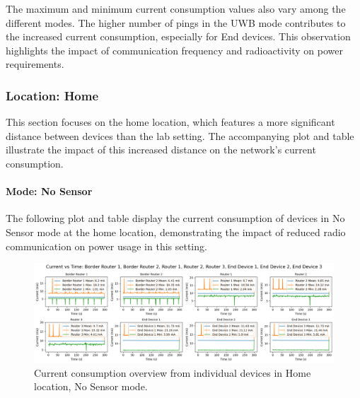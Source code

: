 The maximum and minimum current consumption values also vary among the different modes. The higher number of pings in the UWB mode contributes to the increased current consumption, especially for End devices. This observation highlights the impact of communication frequency and radioactivity on power requirements.

\subsubsection{Location: Home}
This section focuses on the home location, which features a more significant distance between devices than the lab setting. The accompanying plot and table illustrate the impact of this increased distance on the network's current consumption.

\paragraph{Mode: No Sensor}
The following plot and table display the current consumption of devices in No Sensor mode at the home location, demonstrating the impact of reduced radio communication on power usage in this setting.

\begin{figure}[H]
  \centering
  \includegraphics[width=1\textwidth]{images/research_results/current_consumption_analysis/maximum/home/no_sensor/overview.png}
    \caption{Current consumption overview from individual devices in Home location, No Sensor mode.}
    \label{fig:current_consumption_home_no-sensor_overview}
\end{figure}

